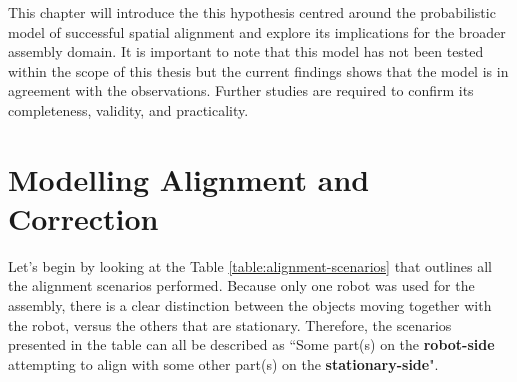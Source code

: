 This chapter will introduce the this hypothesis centred around the probabilistic model of successful spatial alignment and explore its implications for the broader assembly domain. It is important to note that this model has not been tested within the scope of this thesis but the current findings shows that the model is in agreement with the observations. Further studies are required to confirm its completeness, validity, and practicality. 

\section{Modelling Alignment and Correction}
\label{section:new-hypo-modelling-alignment-correction}

Let's begin by looking at the Table \ref{table:alignment-scenarios} that outlines all the alignment scenarios performed. Because only one robot was used for the assembly, there is a clear distinction between the objects moving together with the robot, versus the others that are stationary. Therefore, the scenarios presented in the table can all be described as ``Some part(s) on the \textbf{robot-side} attempting to align with some other part(s) on the \textbf{stationary-side}". 

